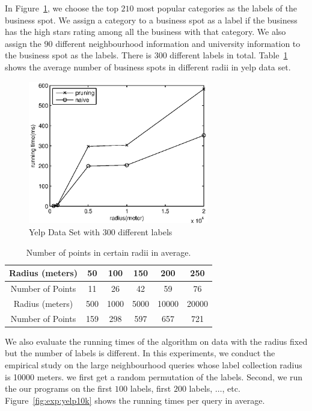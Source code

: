 In Figure~\ref{fig:exp:yelp300l}, we choose the top $210$ most popular categories as the labels of the business spot. We assign a category to a business spot as a label if the business has the high stars rating among all the business with that category. We also assign the $90$ different neighbourhood information and university information to the business spot as the labels. There is 300 different labels in total. Table~\ref{tab:exp:radius} shows the average number of business spots in different radii in yelp data set.

\begin{figure}[h]
    \centering
      \includegraphics[width=0.7\textwidth]{figs/Yelp300Labels}
    \caption{Yelp Data Set with 300 different labels}
    \label{fig:exp:yelp300l}
\end{figure}


\begin{table}[h]
\centering
\begin{tabular}{|c|c|c|c|c|c|}
\hline
Radius (meters)  & 50  & 100  & 150  & 200   & 250   \\ \hline
Number of Points & 11  & 26   & 42   & 59    & 76    \\ \hline
Radius (meters)  & 500 & 1000 & 5000 & 10000 & 20000 \\ \hline
Number of Points & 159 & 298  & 597  & 657   & 721  \\ \hline
\end{tabular}
\caption{Number of points in certain radii in average.}
\label{tab:exp:radius}
\end{table}

We also evaluate the running times of the algorithm on data with the radius fixed but the number of labels is different. In this experiments, we conduct the empirical study on the large neighbourhood queries whose label collection radius is 10000 meters. we first get a random permutation of the labels. Second, we run the our programs on the first $100$ labels, first $200$ labels, $\dots$, etc. Figure~\ref{fig:exp:yelp10k} shows the running times per query in average.

